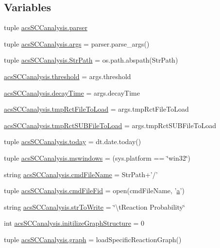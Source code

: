 \subsection*{Variables}
\begin{DoxyCompactItemize}
\item 
tuple \hyperlink{a00128_ae47150d99d4a8e7173bb73a271c4a740}{acs\-S\-C\-Canalysis.\-parser}
\item 
tuple \hyperlink{a00128_aa0fabce811f34f18ba6ecbdd5bcbab6a}{acs\-S\-C\-Canalysis.\-args} = parser.\-parse\-\_\-args()
\item 
tuple \hyperlink{a00128_af8add8b37a9c8a7825c0e8f0e7dfd6c1}{acs\-S\-C\-Canalysis.\-Str\-Path} = os.\-path.\-abspath(Str\-Path)
\item 
\hyperlink{a00128_ae1fe4f15ea3fbcf05be2c82cd6f80307}{acs\-S\-C\-Canalysis.\-threshold} = args.\-threshold
\item 
\hyperlink{a00128_a29728f750a3b57770e836db8409767e9}{acs\-S\-C\-Canalysis.\-decay\-Time} = args.\-decay\-Time
\item 
\hyperlink{a00128_aa2f655aa323f5eaef7509135b8af5722}{acs\-S\-C\-Canalysis.\-tmp\-Rct\-File\-To\-Load} = args.\-tmp\-Rct\-File\-To\-Load
\item 
\hyperlink{a00128_a8dd4ba8a8e597b56376879ba4cf1f41d}{acs\-S\-C\-Canalysis.\-tmp\-Rct\-S\-U\-B\-File\-To\-Load} = args.\-tmp\-Rct\-S\-U\-B\-File\-To\-Load
\item 
tuple \hyperlink{a00128_a5498b0a6851ae4d3b2c3035093564e47}{acs\-S\-C\-Canalysis.\-today} = dt.\-date.\-today()
\item 
tuple \hyperlink{a00128_a2abf09620dd1dd990036c67c626b3dee}{acs\-S\-C\-Canalysis.\-mswindows} = (sys.\-platform == \char`\"{}win32\char`\"{})
\item 
string \hyperlink{a00128_a32551f85ad3cd8080b8ad81828276368}{acs\-S\-C\-Canalysis.\-cmd\-File\-Name} = Str\-Path+'/'
\item 
tuple \hyperlink{a00128_a0a501feb02e67bd6a8ba75490709cf89}{acs\-S\-C\-Canalysis.\-cmd\-File\-Fid} = open(cmd\-File\-Name, '\hyperlink{a00035_a2ffdbad9ea59541e59cbd2b938e0770c}{a}')
\item 
string \hyperlink{a00128_a1966f0657c6b477eeb60bde732a201cc}{acs\-S\-C\-Canalysis.\-str\-To\-Write} = \char`\"{}\textbackslash{}t\-Reaction Probability\char`\"{}
\item 
int \hyperlink{a00128_ac6ad18bfc83e8ea3254897d46f990855}{acs\-S\-C\-Canalysis.\-initilize\-Graph\-Structure} = 0
\item 
tuple \hyperlink{a00128_ab45392da38059bf7557c22cbc73e5580}{acs\-S\-C\-Canalysis.\-graph} = load\-Specific\-Reaction\-Graph()

\end{DoxyCompactItemize}
